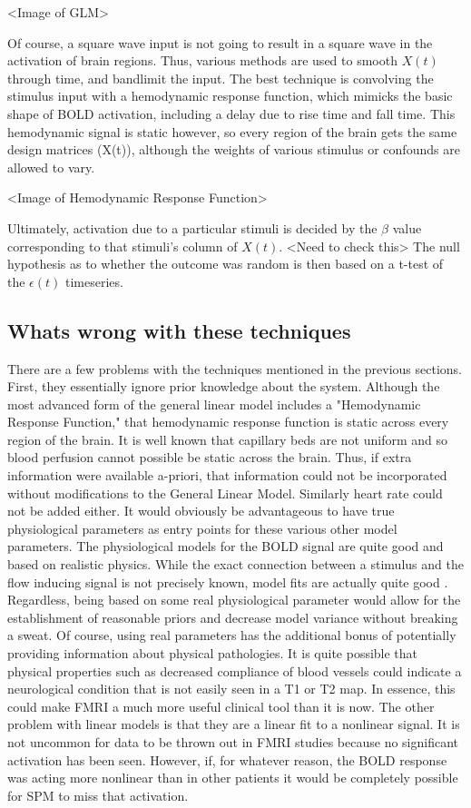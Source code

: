 \documentclass{article}
\begin{document}
<Image of GLM>

Of course, a square wave input is not going to result in a square wave
in the activation of brain regions. Thus, various methods are used to 
smooth $X(t)$ through time, and bandlimit the input. The best technique
is convolving the stimulus input with a hemodynamic response function,
which mimicks the basic shape of BOLD activation, including a delay
due to rise time and fall time. This hemodynamic signal is static however,
so every region of the brain gets the same design matrices (X(t)), 
although the weights of various stimulus or confounds are allowed to vary. 

<Image of Hemodynamic Response Function>

Ultimately, activation due to a particular stimuli is decided by the 
$\beta$ value corresponding to that stimuli's column of $X(t)$.
<Need to check this>
The null hypothesis as to whether the outcome was random is then
based on a t-test of the $\epsilon(t)$ timeseries. 

\subsection{Whats wrong with these techniques}
There are a few problems with the techniques mentioned in the 
previous sections. First, they essentially ignore prior knowledge about
the system. Although the most advanced form of the general linear model includes
a "Hemodynamic Response Function," that hemodynamic response function is
static across every region of the brain. It is well known that capillary beds
are not uniform and so blood perfusion cannot possible be static across the
brain. Thus, if extra information were available a-priori, that information
could not be incorporated without modifications to the General Linear Model.
Similarly heart rate could not be added either. It would obviously be advantageous
to have true physiological parameters as entry points for these various other
model parameters. The physiological models for the BOLD signal are quite good
and based on realistic physics. While the exact connection between a stimulus
and the flow inducing signal is not precisely known, model fits are actually
quite good \cite{nonlinearmodels}. Regardless, being based on some real 
physiological 
parameter would allow for the establishment of reasonable priors and decrease
model variance without breaking a sweat. Of course, using real parameters 
has the additional
bonus of potentially providing information about physical pathologies. It
is quite possible that physical properties such as decreased compliance of
blood vessels could indicate a neurological condition that is not easily
seen in a T1 or T2 map. In essence, this could make FMRI a much more 
useful clinical tool than it is now. The other problem with linear models
is that they are a linear fit to a nonlinear signal. It is not uncommon
for data to be thrown out in FMRI studies because no significant activation
has been seen. However, if, for whatever reason, the BOLD response
was acting more nonlinear than in other patients it would be completely
possible for SPM to miss that activation. 
\end{document}
